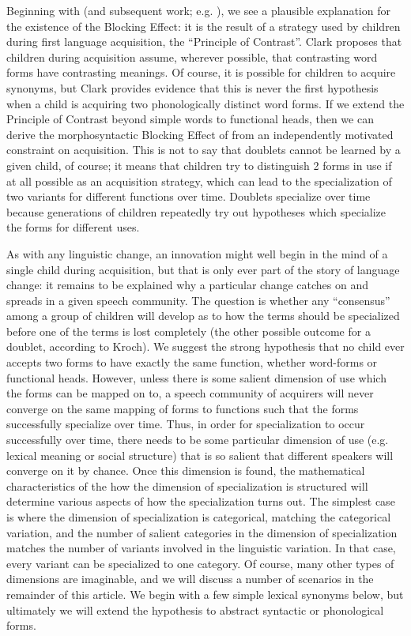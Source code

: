 Beginning with \citet{clark1987} (and subsequent work; e.g. \citealt{clark1990}), we see a plausible explanation for the existence of the Blocking Effect: it is the result of a strategy used by children during first language acquisition, the ``Principle of Contrast''.
Clark proposes that children during acquisition assume, wherever possible, that contrasting word forms have contrasting meanings.
Of course, it is possible for children to acquire synonyms, but Clark provides evidence that this is never the first hypothesis when a child is acquiring two phonologically distinct word forms.
If we extend the Principle of Contrast beyond simple words to functional heads, then we can derive the morphosyntactic Blocking Effect of \citet{kroch1994} from an independently motivated constraint on acquisition.
This is not to say that doublets cannot be learned by a given child, of course; it means that children try to distinguish 2 forms in use if at all possible as an acquisition strategy, which can lead to the specialization of two variants for different functions over time.
Doublets specialize over time because generations of children repeatedly try out hypotheses which specialize the forms for different uses.

As with any linguistic change, an innovation might well begin in the mind of a single child during acquisition, but that is only ever part of the story of language change: it remains to be explained why a particular change catches on and spreads in a given speech community.
The question is whether any ``consensus'' among a group of children will develop as to how the terms should be specialized before one of the terms is lost completely (the other possible outcome for a doublet, according to Kroch).
We suggest the strong hypothesis that no child ever accepts two forms to have exactly the same function, whether word-forms or functional heads.
However, unless there is some salient dimension of use which the forms can be mapped on to, a speech community of acquirers will never converge on the same mapping of forms to functions such that the forms successfully specialize over time.
Thus, in order for specialization to occur successfully over time, there needs to be some particular dimension of use (e.g. lexical meaning or social structure) that is so salient that different speakers will converge on it by chance.
Once this dimension is found, the mathematical characteristics of the how the dimension of specialization is structured will determine various aspects of how the specialization turns out.
The simplest case is where the dimension of specialization is categorical, matching the categorical variation, and the number of salient categories in the dimension of specialization matches the number of variants involved in the linguistic variation. 
In that case, every variant can be specialized to one category.
Of course, many other types of dimensions are imaginable, and we will discuss a number of scenarios in the remainder of this article.
We begin with a few simple lexical synonyms below, but ultimately we will extend the hypothesis to abstract syntactic or phonological forms.

